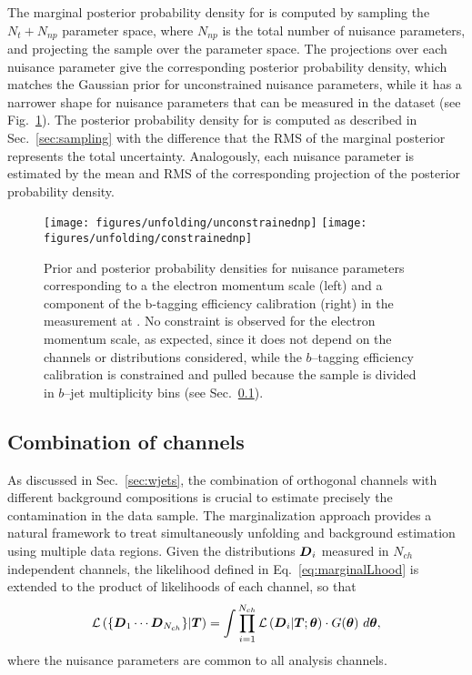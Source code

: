 The marginal posterior probability density for \Truth{} is computed by
sampling the $N_t+N_{np}$ parameter space, where $N_{np}$ is the
total number of nuisance parameters, and projecting the sample over
the \Truth{} parameter space. The projections over each nuisance
parameter give the corresponding posterior probability density,
which matches the Gaussian prior for unconstrained nuisance
parameters, while it has a narrower shape for nuisance parameters
that can be measured in the dataset (see Fig.~\ref{fig:nuisparpost}).
The posterior probability density for \ac{} is computed as described in
Sec.~\ref{sec:sampling} with the difference that the RMS of the
marginal posterior represents the total uncertainty. Analogously, each
nuisance parameter is estimated by the mean and RMS of the
corresponding projection of the posterior probability density.

\begin{figure}[!htb]\centering
  \texttt{[image: figures/unfolding/unconstrainednp]}
  \texttt{[image: figures/unfolding/constrainednp]}
  \caption{Prior and posterior probability densities for nuisance parameters
    corresponding to a the electron momentum scale (left) and a
    component of the b-tagging efficiency calibration (right) in the measurement
    at \eighttev{}. No constraint is observed for the electron
    momentum scale, as expected, since it does not depend on the
    channels or distributions considered, while the $b$--tagging
    efficiency calibration is constrained and pulled because the
    sample is divided in $b$--jet multiplicity bins (see Sec.~\ref{sec:chcomb}).}
  \label{fig:nuisparpost}
\end{figure}

\subsection{Combination of channels}
\label{sec:chcomb}

As discussed in Sec.~\ref{sec:wjets}, the combination of
orthogonal channels with different background compositions is crucial
to estimate precisely the \wjets{} contamination in the \eighttev{}
data sample.
The marginalization approach provides a natural framework to treat
simultaneously unfolding and background estimation using
multiple data regions. Given the distributions $\boldsymbol{D}{}_i$ measured in $N_{ch}$
independent channels, the likelihood defined in Eq.~\ref{eq:marginalLhood}
is extended to the product of likelihoods of each channel, so that
\begin{equation}
  \mathcal{L}\left(\{\boldsymbol{D}{}_1\cdots{}\boldsymbol{D}{}_{N_{ch}}\}|\boldsymbol{T}{}\right)=
  \int
  \prod_{i=1}^{N_{ch}}\mathcal{L}\left(\boldsymbol{D}{}_i|\boldsymbol{T}{};\boldsymbol{\theta}{}\right) 
  \cdot{} G(\boldsymbol{\theta}{})
  ~d\boldsymbol{\theta}{},
\end{equation}
where the nuisance parameters are common to all analysis channels.

